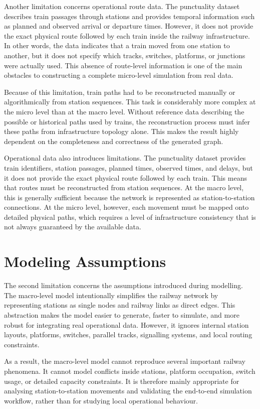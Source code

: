 Another limitation concerns operational route data. The punctuality dataset describes train passages through stations and 
provides temporal information such as planned and observed arrival or departure times. However, it does not provide the 
exact physical route followed by each train inside the railway infrastructure. In other words, the data indicates that a 
train moved from one station to another, but it does not specify which tracks, switches, platforms, or junctions were 
actually used. This absence of route-level information is one of the main obstacles to constructing a complete micro-level 
simulation from real data.

Because of this limitation, train paths had to be reconstructed manually or algorithmically from station sequences. This 
task is considerably more complex at the micro level than at the macro level. Without reference data describing the 
possible or historical paths used by trains, the reconstruction process must infer these paths from infrastructure 
topology alone. This makes the result highly dependent on the completeness and correctness of the generated graph.

Operational data also introduces limitations. The punctuality dataset provides train identifiers, station passages, planned 
times, observed times, and delays, but it does not provide the exact physical route followed by each train. This means that 
routes must be reconstructed from station sequences. At the macro level, this is generally sufficient because the network 
is represented as station-to-station connections. At the micro level, however, each movement must be mapped onto detailed 
physical paths, which requires a level of infrastructure consistency that is not always guaranteed by the available data.

\section{Modeling Assumptions}
The second limitation concerns the assumptions introduced during modelling. The macro-level model intentionally simplifies 
the railway network by representing stations as single nodes and railway links as direct edges. This abstraction makes the 
model easier to generate, faster to simulate, and more robust for integrating real operational data. However, it ignores 
internal station layouts, platforms, switches, parallel tracks, signalling systems, and local routing constraints.

As a result, the macro-level model cannot reproduce several important railway phenomena. It cannot model conflicts inside 
stations, platform occupation, switch usage, or detailed capacity constraints. It is therefore mainly appropriate for 
analysing station-to-station movements and validating the end-to-end simulation workflow, rather than for studying local 
operational behaviour.

